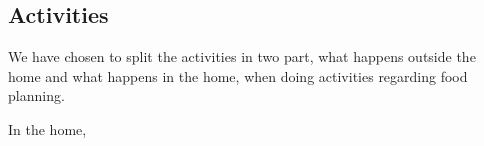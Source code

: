 \subsection{Activities}
We have chosen to split the activities in two part, what happens outside the home and what happens in the home, when doing activities regarding food planning.

In the home,